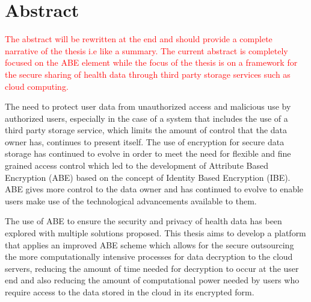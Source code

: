 \chapter*{Abstract}

\textcolor{red}{The abstract will be rewritten at the end and should provide a complete narrative of the thesis i.e like a summary. The current abstract is completely focused on the ABE element while the focus of the thesis is on a framework for the secure sharing of health data through third party storage services such as cloud computing.}

The need to protect user data from unauthorized access and malicious use by authorized users, especially in the case of a system that includes the use of a third party storage service, which limits the amount of control that the data owner has, continues to present itself. The use of encryption for secure data storage has continued to evolve in order to meet the need for flexible and fine grained access control which led to the development of Attribute Based Encryption (ABE) based on the concept of Identity Based Encryption (IBE). ABE gives more control to the data owner and has continued to evolve to enable users make use of the technological advancements available to them.

The use of ABE to ensure the security and privacy of health data has been explored with multiple solutions proposed. This thesis aims to develop a platform that applies an improved ABE scheme which allows for the secure outsourcing the more computationally intensive processes for data decryption to the cloud servers, reducing the amount of time needed for decryption to occur at the user end and also reducing the amount of computational power needed by users who require access to the data stored in the cloud in its encrypted form.